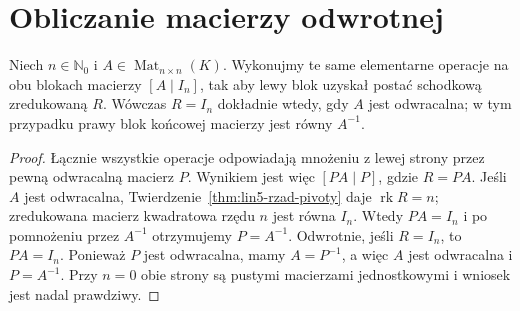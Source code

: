 \section{Obliczanie macierzy odwrotnej}
\label{sec:lin5-odwracanie}

\begin{twierdzenie}
\label{thm:lin5-gauss-jordan-odwrotnosc}
Niech \(n\in\mathbb N_0\) i
\(A\in\operatorname{Mat}_{n\times n}(K)\).
Wykonujmy te same elementarne operacje
na obu blokach macierzy \([A\mid I_n]\),
tak aby lewy blok uzyskał postać
schodkową zredukowaną \(R\).
Wówczas \(R=I_n\) dokładnie wtedy,
gdy \(A\) jest odwracalna; w tym przypadku
prawy blok końcowej macierzy jest równy
\(A^{-1}\).
\end{twierdzenie}
\begin{proof}
Łącznie wszystkie operacje odpowiadają
mnożeniu z lewej strony przez pewną
odwracalną macierz \(P\).
Wynikiem jest więc \([PA\mid P]\),
gdzie \(R=PA\).
Jeśli \(A\) jest odwracalna,
Twierdzenie~\ref{thm:lin5-rzad-pivoty}
daje \(\operatorname{rk}R=n\);
zredukowana macierz kwadratowa rzędu \(n\)
jest równa \(I_n\).
Wtedy \(PA=I_n\) i po pomnożeniu przez
\(A^{-1}\) otrzymujemy \(P=A^{-1}\).
Odwrotnie, jeśli \(R=I_n\),
to \(PA=I_n\). Ponieważ \(P\) jest odwracalna,
mamy \(A=P^{-1}\), a więc \(A\) jest
odwracalna i \(P=A^{-1}\).
Przy \(n=0\) obie strony są pustymi
macierzami jednostkowymi i wniosek
jest nadal prawdziwy.
\end{proof}

